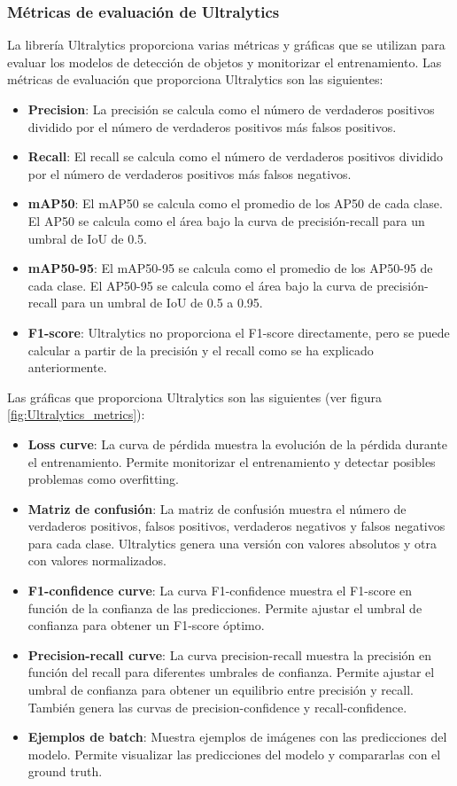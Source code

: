 \subsubsection{Métricas de evaluación de Ultralytics\label{SEC:METRICAS_ULTRALYTICS}}
La librería Ultralytics proporciona varias métricas y gráficas que se utilizan para evaluar los modelos de detección de objetos y monitorizar el entrenamiento. Las métricas de evaluación que proporciona Ultralytics son las siguientes:
\begin{itemize}
    \item \textbf{Precision}: La precisión se calcula como el número de verdaderos positivos dividido por el número de verdaderos positivos más falsos positivos.
    \item \textbf{Recall}: El recall se calcula como el número de verdaderos positivos dividido por el número de verdaderos positivos más falsos negativos.
    \item \textbf{mAP50}: El mAP50 se calcula como el promedio de los AP50 de cada clase. El AP50 se calcula como el área bajo la curva de precisión-recall para un umbral de IoU de 0.5.
    \item \textbf{mAP50-95}: El mAP50-95 se calcula como el promedio de los AP50-95 de cada clase. El AP50-95 se calcula como el área bajo la curva de precisión-recall para un umbral de IoU de 0.5 a 0.95.
    \item \textbf{F1-score}: Ultralytics no proporciona el F1-score directamente, pero se puede calcular a partir de la precisión y el recall como se ha explicado anteriormente.
\end{itemize}

Las gráficas que proporciona Ultralytics son las siguientes (ver figura \ref{fig:Ultralytics_metrics}):

\begin{itemize}
    \item \textbf{Loss curve}: La curva de pérdida muestra la evolución de la pérdida durante el entrenamiento. Permite monitorizar el entrenamiento y detectar posibles problemas como overfitting.
    \item \textbf{Matriz de confusión}: La matriz de confusión muestra el número de verdaderos positivos, falsos positivos, verdaderos negativos y falsos negativos para cada clase. Ultralytics genera una versión con valores absolutos y otra con valores normalizados.
    \item \textbf{F1-confidence curve}: La curva F1-confidence muestra el F1-score en función de la confianza de las predicciones. Permite ajustar el umbral de confianza para obtener un F1-score óptimo.
    \item \textbf{Precision-recall curve}: La curva precision-recall muestra la precisión en función del recall para diferentes umbrales de confianza. Permite ajustar el umbral de confianza para obtener un equilibrio entre precisión y recall. También genera las curvas de precision-confidence y recall-confidence.
    \item \textbf{Ejemplos de batch}: Muestra ejemplos de imágenes con las predicciones del modelo. Permite visualizar las predicciones del modelo y compararlas con el ground truth.
\end{itemize}

